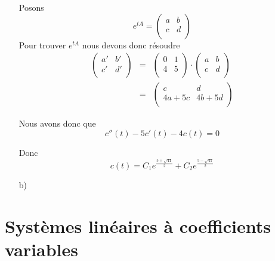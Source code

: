 \documentclass[fontsize=12pt]{article}
\begin{document}
\begin{enumerate}
    Posons
    \begin{equation}
      e^{tA}= \left(
        \begin{matrix}
          a&b \\
          c&d \\
        \end{matrix}
      \right)
    \end{equation}
    Pour trouver $e^{tA}$ nous devons donc résoudre
    \begin{eqnarray*}
      \left(
        \begin{matrix}
          a'&b' \\
          c'&d' \\
        \end{matrix}
      \right) &=&\left(
        \begin{matrix}
          0&1 \\
          4&5 \\
        \end{matrix}
      \right) \cdot\left( \begin{matrix}
          a&b \\
          c&d \\
        \end{matrix}
      \right)\\
      &=& \left(
      \begin{matrix}
        c&d \\
        4a+5c&4b+5d \\
      \end{matrix}
    \right)
  \end{eqnarray*}

  Nous avons donc que
  \begin{equation}
    c''(t) -5c'(t) -4c(t)=0
  \end{equation}

  Donc
  \begin{equation}
    c(t) = C_1 e^{\frac{5+\sqrt{41}}{2}} + C_2 e^{\frac{5-\sqrt{41}}{2}}
  \end{equation}



\item[b)]
\end{enumerate}


\section{Systèmes linéaires à coefficients variables}
\end{document}
